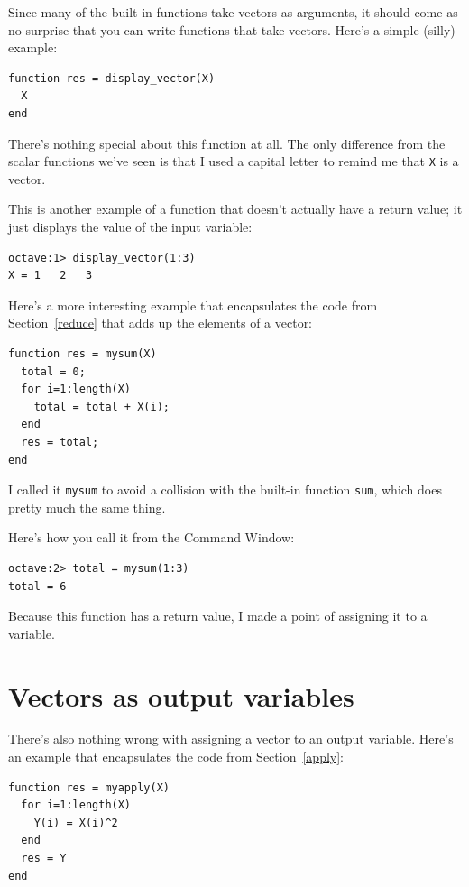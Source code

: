 \documentclass{book}
\begin{document}
Since many of the built-in functions take vectors as arguments,
it should come as no surprise that you can write functions that
take vectors. Here's a simple (silly) example:

\begin{verbatim}
function res = display_vector(X)
  X
end
\end{verbatim}

There's nothing special about this function at all. The only
difference from the scalar functions we've seen is that I used
a capital letter to remind me that {\tt X} is a vector.

This is another example of a function that doesn't actually have
a return value; it just displays the value of the input variable:

\begin{verbatim}
octave:1> display_vector(1:3)
X = 1   2   3
\end{verbatim}

Here's a more interesting example that encapsulates the code
from Section~\ref{reduce} that adds up the elements of a vector:

\begin{verbatim}
function res = mysum(X)
  total = 0;
  for i=1:length(X)
    total = total + X(i);
  end
  res = total;
end
\end{verbatim}

I called it {\tt mysum} to avoid a collision with the built-in
function {\tt sum}, which does pretty much the same thing.

Here's how you call it from the Command Window:

\begin{verbatim}
octave:2> total = mysum(1:3)
total = 6
\end{verbatim}

Because this function has a return value, I made a
point of assigning it to a variable.


\section{Vectors as output variables}

There's also nothing wrong with assigning a vector to an output
variable. Here's an example that encapsulates the code from
Section~\ref{apply}:

\begin{verbatim}
function res = myapply(X)
  for i=1:length(X)
    Y(i) = X(i)^2
  end
  res = Y
end
\end{verbatim}
\end{document}
